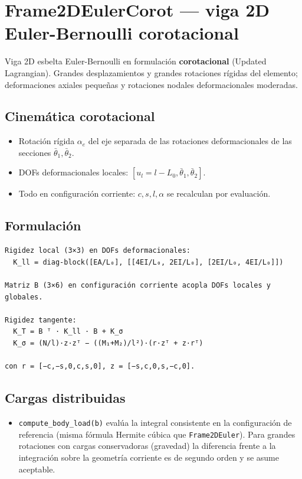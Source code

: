 \documentclass[11pt,letterpaper,oneside]{report}
\begin{document}
\section{Frame2DEulerCorot --- viga 2D Euler-Bernoulli corotacional}

Viga 2D esbelta Euler-Bernoulli en formulación \textbf{corotacional} (Updated Lagrangian). Grandes desplazamientos y grandes rotaciones rígidas del elemento; deformaciones axiales pequeñas y rotaciones nodales deformacionales moderadas.

\subsection{Cinemática corotacional}
\begin{itemize}
  \item Rotación rígida $\alpha_e$ del eje separada de las rotaciones deformacionales de las secciones $\bar\theta_1, \bar\theta_2$.
  \item DOFs deformacionales locales: $[u_l = l - L_0, \bar\theta_1, \bar\theta_2]$.
  \item Todo en configuración corriente: $c, s, l, \alpha$ se recalculan por evaluación.
\end{itemize}

\subsection{Formulación}
\begin{lstlisting}
Rigidez local (3×3) en DOFs deformacionales:
  K_ll = diag-block([EA/L₀], [[4EI/L₀, 2EI/L₀], [2EI/L₀, 4EI/L₀]])

Matriz B (3×6) en configuración corriente acopla DOFs locales y globales.

Rigidez tangente:
  K_T = B ᵀ · K_ll · B + K_σ
  K_σ = (N/l)·z·zᵀ − ((M₁+M₂)/l²)·(r·zᵀ + z·rᵀ)

con r = [−c,−s,0,c,s,0], z = [−s,c,0,s,−c,0].

\end{lstlisting}

\subsection{Cargas distribuidas}
\begin{itemize}
  \item \texttt{compute\_body\_load(b)} evalúa la integral consistente en la configuración de referencia (misma fórmula Hermite cúbica que \texttt{Frame2DEuler}). Para grandes rotaciones con cargas conservadoras (gravedad) la diferencia frente a la integración sobre la geometría corriente es de segundo orden y se asume aceptable.
\end{itemize}
\end{document}
